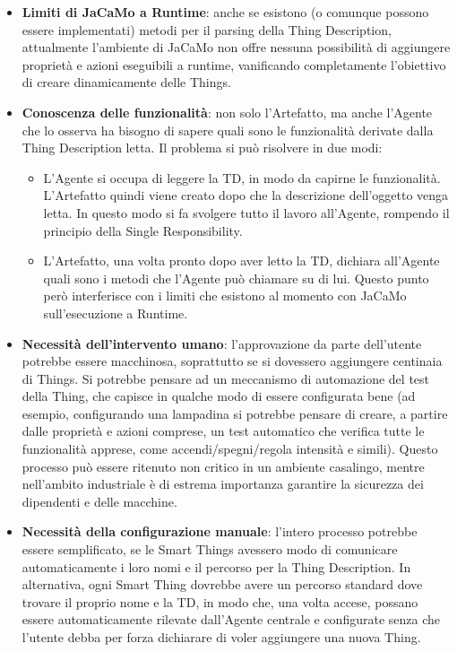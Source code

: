 \documentclass[12pt,a4paper,openright,oneside]{report}
\begin{document}
\begin{itemize}
	\item \textbf{Limiti di JaCaMo a Runtime}: anche se esistono (o comunque possono essere implementati) metodi per il parsing della Thing Description, attualmente l'ambiente di JaCaMo non offre nessuna possibilità di aggiungere proprietà e azioni eseguibili a runtime, vanificando completamente l'obiettivo di creare dinamicamente delle Things. 
	
	\item \textbf{Conoscenza delle funzionalità}: non solo l'Artefatto, ma anche l'Agente che lo osserva ha bisogno di sapere quali sono le funzionalità derivate dalla Thing Description letta. Il problema si può risolvere in due modi:
	
	\begin{itemize}
		\item L'Agente si occupa di leggere la TD, in modo da capirne le funzionalità. L'Artefatto quindi viene creato dopo che la descrizione dell'oggetto venga letta. In questo modo si fa svolgere tutto il lavoro all'Agente, rompendo il principio della Single Responsibility.
		
		\item L'Artefatto, una volta pronto dopo aver letto la TD, dichiara all'Agente quali sono i metodi che l'Agente può chiamare su di lui. Questo punto però interferisce con i limiti che esistono al momento con JaCaMo sull'esecuzione a Runtime.
	\end{itemize}
	
	\item \textbf{Necessità dell'intervento umano}: l'approvazione da parte dell'utente potrebbe essere macchinosa, soprattutto se si dovessero aggiungere centinaia di Things. Si potrebbe pensare ad un meccanismo di automazione del test della Thing, che capisce in qualche modo di essere configurata bene (ad esempio, configurando una lampadina si potrebbe pensare di creare, a partire dalle proprietà e azioni comprese, un test automatico che verifica tutte le funzionalità apprese, come accendi/spegni/regola intensità e simili). Questo processo può essere ritenuto non critico in un ambiente casalingo, mentre nell'ambito industriale è di estrema importanza garantire la sicurezza dei dipendenti e delle macchine.
	
	\item \textbf{Necessità della configurazione manuale}: l'intero processo potrebbe essere semplificato, se le Smart Things avessero modo di comunicare automaticamente i loro nomi e il percorso per la Thing Description. In alternativa, ogni Smart Thing dovrebbe avere un percorso standard dove trovare il proprio nome e la TD, in modo che, una volta accese, possano essere automaticamente rilevate dall'Agente centrale e configurate senza che l'utente debba per forza dichiarare di voler aggiungere una nuova Thing.
	

\end{itemize}
\end{document}
